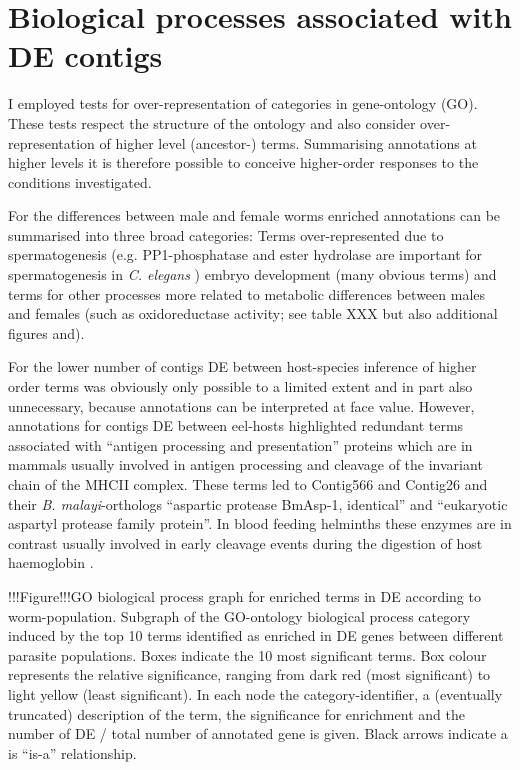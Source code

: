 \documentclass[10pt]{article}
\begin{document}
\section{Biological processes associated with DE contigs}

I employed tests for over-representation of categories in
gene-ontology (GO). These tests respect the structure of the ontology
and also consider over-representation of higher level (ancestor-)
terms. Summarising annotations at higher levels it is therefore
possible to conceive higher-order responses to the conditions
investigated.

For the differences between male and female worms enriched annotations
can be summarised into three broad categories: Terms over-represented
due to spermatogenesis (e.g. PP1-phosphatase and ester hydrolase are
important for spermatogenesis in \textit{C. elegans}
\cite{wormbook_sperm, fardilha2011protein}) embryo development (many
obvious terms) and terms for other processes more related to metabolic
differences between males and females (such as oxidoreductase
activity; see table XXX but also additional figures and).

For the lower number of contigs DE between host-species inference of
higher order terms was obviously only possible to a limited extent and
in part also unnecessary, because annotations can be interpreted at
face value. However, annotations for contigs DE between eel-hosts
highlighted redundant terms associated with ``antigen processing and
presentation'' proteins which are in mammals usually involved in
antigen processing and cleavage of the invariant chain of the MHCII
complex. These terms led to Contig566 and Contig26 and their
\textit{B. malayi}-orthologs ``aspartic protease BmAsp-1, identical''
and ``eukaryotic aspartyl protease family protein''. In blood feeding
helminths these enzymes are in contrast usually involved in early
cleavage events during the digestion of host haemoglobin
\cite{pmid12782060}.


!!!Figure!!!GO biological process graph for enriched terms in DE
according to worm-population. Subgraph of the GO-ontology biological
process category induced by the top 10 terms identified as enriched in
DE genes between different parasite populations. Boxes indicate the 10
most significant terms. Box colour represents the relative
significance, ranging from dark red (most significant) to light yellow
(least significant). In each node the category-identifier, a
(eventually truncated) description of the term, the significance for
enrichment and the number of DE / total number of annotated gene is
given. Black arrows indicate a is ``is-a'' relationship.
\end{document}
